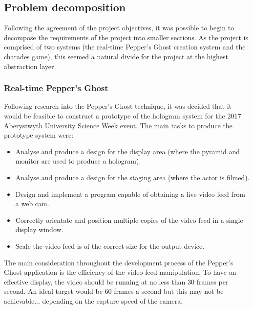 \subsection{Problem decomposition}
Following the agreement of the project objectives, it was possible to begin to decompose the requirements of the project into smaller sections. As the project is comprised of two systems (the real-time Pepper's Ghost creation system and the charades game), this seemed a natural divide for the project at the highest abstraction layer.

\subsubsection{Real-time Pepper's Ghost}
Following research into the Pepper's Ghost technique, it was decided that it would be feasible to construct a prototype of the hologram system for the 2017 Aberystwyth University Science Week event. The main tasks to produce the prototype system were:

\begin{itemize}
	\item Analyse and produce a design for the display area (where the pyramid and monitor are used to produce a hologram).
	
	\item Analyse and produce a design for the staging area (where the actor is filmed).
	
	\item Design and implement a program capable of obtaining a live video feed from a web cam.
	
	\item Correctly orientate and position multiple copies of the video feed in a single display window.

	\item Scale the video feed is of the correct size for the output device.

\end{itemize}

The main consideration throughout the development process of the Pepper's Ghost application is the efficiency of the video feed manipulation. To have an effective display, the video should be running at no less than 30 frames per second. An ideal target would be 60 frames a second but this may not be achievable... depending on the capture speed of the camera.
 
